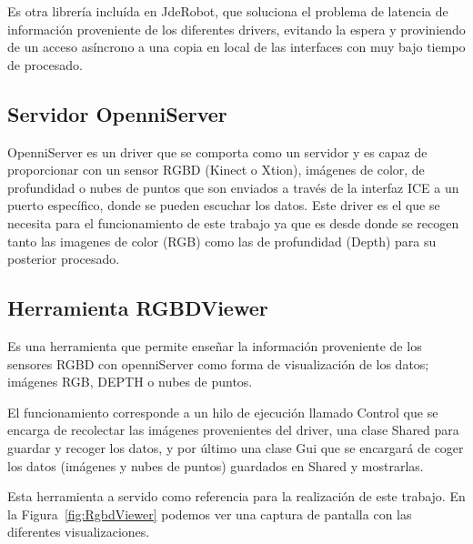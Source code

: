Es otra librería incluída en JdeRobot, que soluciona el problema de latencia de información proveniente de los diferentes drivers, evitando la espera y proviniendo de un acceso asíncrono a una copia en local de las interfaces con muy bajo tiempo de procesado.

\subsection{Servidor OpenniServer}

OpenniServer es un driver que se comporta como un servidor y es capaz de proporcionar con un sensor RGBD (Kinect o Xtion), imágenes de color, de profundidad o nubes de puntos que son enviados a través de la interfaz ICE a un puerto específico, donde se pueden escuchar los datos. Este driver es el que se necesita para el funcionamiento de este trabajo ya que es desde donde se recogen tanto las imagenes de color (RGB) como las de profundidad (Depth) para su posterior procesado.

\subsection{Herramienta RGBDViewer}

Es una herramienta que permite enseñar la información proveniente de los sensores RGBD con openniServer como forma de visualización de los datos; imágenes RGB, DEPTH o nubes de puntos.

El funcionamiento corresponde a un hilo de ejecución llamado Control que se encarga de recolectar las imágenes provenientes del driver, una clase Shared para guardar y recoger los datos, y por último una clase Gui que se encargará de coger los datos (imágenes y nubes de puntos) guardados en Shared y mostrarlas.


Esta herramienta a servido como referencia para la realización de este trabajo. En la Figura~\ref{fig:RgbdViewer} podemos ver una captura de pantalla con las diferentes visualizaciones. 

